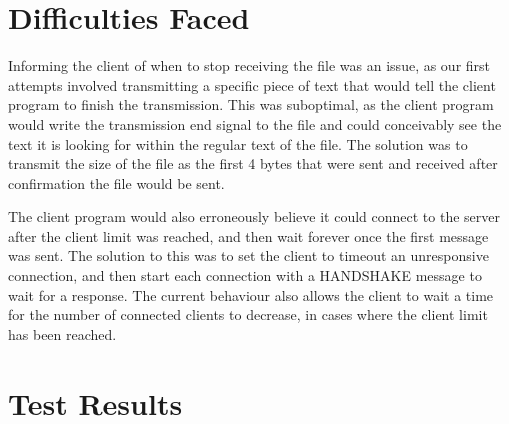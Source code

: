 \documentclass{article}
\begin{document}
\section{Difficulties Faced}
Informing the client of when to stop receiving the file was an issue, as our first attempts involved transmitting a specific piece of text that would tell the client program to finish the transmission. This was suboptimal, as the client program would write the transmission end signal to the file and could conceivably see the text it is looking for within the regular text of the file. The solution was to transmit the size of the file as the first 4 bytes that were sent and received after confirmation the file would be sent.

The client program would also erroneously believe it could connect to the server after the client limit was reached, and then wait forever once the first message was sent. The solution to this was to set the client to timeout an unresponsive connection, and then start each connection with a HANDSHAKE message to wait for a response. The current behaviour also allows the client to wait a time for the number of connected clients to decrease, in cases where the client limit has been reached.  

\section{Test Results}
\end{document}
